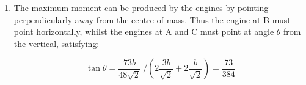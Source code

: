 \begin{problem}
{\begin{enumerate}
	Redefining $M$ as the total mass of the three ships, each of mass $m~ (= 16 b^2)$, and $D$ as the distance of the c.o.m. relative to the centre of the square made by four ships in formation, where the base of each ship is a distance $\frac{a}{\sqrt2} = \frac{3b}{\sqrt2}$ from this point. Only the middle ship has a component of it's position in the direction of $D$, thus:
	
	\begin{equation} M D = 3 m D = m \left(  \frac{3b}{\sqrt2} +  \frac{25b}{16\sqrt{2}} \right) \end{equation}
	
	\begin{equation}\Rightarrow D = \frac{1}{3} \left( \frac{73 b}{16\sqrt{2}} \right) = \frac{73b}{48\sqrt{2}} \end{equation}
	
	
	\item
	
	The maximum moment can be produced by the engines by pointing perpendicularly away from the centre of mass. Thus the engine at B must point horizontally, whilst the engines at A and C must point at angle $\theta$ from the vertical, satisfying:
	
	\begin{equation} \tan{\theta} = \frac{73b}{48\sqrt{2}}~ \Big/ \left(2 \frac{3b}{\sqrt{2}} + 2 \frac{b}{\sqrt{2}}  \right) = \frac{73}{384} \end{equation}
	
	
	
	


\end{enumerate}
}
\end{problem}